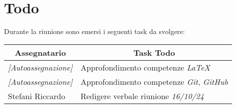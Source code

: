 \section{Todo}

Durante la riunione sono emersi i seguenti task da svolgere:

\vspace{0.5cm}

\begin{table}[htbp]
\begin{tabular}{|p{}|p{}|}
    \hline
    \multicolumn{1}{|c|}{\textbf{Assegnatario}} & \multicolumn{1}{|c|}{\textbf{Task Todo}} \\
    \hline
    \emph{[Autoassegnazione]} & Approfondimento competenze \emph{LaTeX} \\
    \hline
    \emph{[Autoassegnazione]} & Approfondimento competenze \emph{Git}, \emph{GitHub} \\
    \hline
    Stefani Riccardo & Redigere verbale riunione \emph{16/10/24} \\
    \hline
\end{tabular}
\end{table}